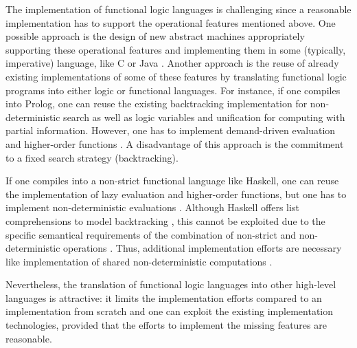 \documentclass{llncs}
\begin{document}
The implementation of functional logic languages is challenging
since a reasonable implementation has to support the operational
features mentioned above.
One possible approach
is the design of new abstract machines appropriately supporting
these operational features and implementing them in some (typically,
imperative) language, like C \cite{Lux99FLOPS}
or Java \cite{AntoyHanusLiuTolmach05,HanusSadre99JFLP}.
Another approach is the reuse of already existing implementations
of some of these features by translating
functional logic programs into either logic or functional languages.
For instance, if one compiles into Prolog, one can reuse
the existing backtracking implementation for non-deterministic
search as well as logic variables and unification for computing with partial
information. However, one has to implement demand-driven evaluation
and higher-order functions \cite{AntoyHanus00FROCOS}.
A disadvantage of this approach is the commitment to a fixed
search strategy (backtracking).

If one compiles into a non-strict functional language like Haskell,
one can reuse the implementation
of lazy evaluation and higher-order functions, but one has
to implement non-deterministic evaluations
\cite{BrasselFischerHanusReck11,BrasselHuch07}.
Although Haskell offers list comprehensions to model
backtracking \cite{Wadler85}, this cannot be exploited
due to the specific semantical requirements of the combination
of non-strict and non-deterministic operations
\cite{GonzalezEtAl99}. Thus, additional implementation efforts
are necessary like implementation of shared
non-deterministic computations \cite{FischerKiselyovShan09}.

Nevertheless, the translation of functional logic languages
into other high-level languages is attractive:
it limits the implementation efforts compared to an implementation
from scratch and one can exploit the existing implementation technologies,
provided that the efforts to implement the missing features
are reasonable.
\end{document}
